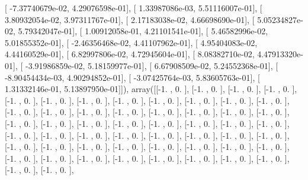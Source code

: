 \documentclass{article}
\begin{document}
       [ -7.37740679e-02,   4.29076598e-01],
       [  1.33987086e-03,   5.51116007e-01],
       [  3.80932054e-02,   3.97311767e-01],
       [  2.17183038e-02,   4.66698690e-01],
       [  5.05234827e-02,   5.79342047e-01],
       [  1.00912058e-01,   4.21101541e-01],
       [  5.46582996e-02,   5.01855352e-01],
       [ -2.46356468e-02,   4.41107962e-01],
       [  4.95404083e-02,   4.44160529e-01],
       [  6.82997806e-02,   4.72945604e-01],
       [  8.08382710e-02,   4.47913320e-01],
       [ -3.91986859e-02,   5.18159977e-01],
       [  6.67908509e-02,   5.24552368e-01],
       [ -8.90454434e-03,   4.90294852e-01],
       [ -3.07425764e-03,   5.83605763e-01],
       [  1.31332146e-01,   5.13897950e-01]]), array([[-1.        ,  0.        ],
       [-1.        ,  0.        ],
       [-1.        ,  0.        ],
       [-1.        ,  0.        ],
       [-1.        ,  0.        ],
       [-1.        ,  0.        ],
       [-1.        ,  0.        ],
       [-1.        ,  0.        ],
       [-1.        ,  0.        ],
       [-1.        ,  0.        ],
       [-1.        ,  0.        ],
       [-1.        ,  0.        ],
       [-1.        ,  0.        ],
       [-1.        ,  0.        ],
       [-1.        ,  0.        ],
       [-1.        ,  0.        ],
       [-1.        ,  0.        ],
       [-1.        ,  0.        ],
       [-1.        ,  0.        ],
       [-1.        ,  0.        ],
       [-1.        ,  0.        ],
       [-1.        ,  0.        ],
       [-1.        ,  0.        ],
       [-1.        ,  0.        ],
       [-1.        ,  0.        ],
       [-1.        ,  0.        ],
       [-1.        ,  0.        ],
       [-1.        ,  0.        ],
       [-1.        ,  0.        ],
       [-1.        ,  0.        ],
       [-1.        ,  0.        ],
       [-1.        ,  0.        ],
       [-1.        ,  0.        ],
       [-1.        ,  0.        ],
       [-1.        ,  0.        ],
       [-1.        ,  0.        ],
       [-1.        ,  0.        ],
       [-1.        ,  0.        ],
       [-1.        ,  0.        ],
       [-1.        ,  0.        ],
       [-1.        ,  0.        ],
       [-1.        ,  0.        ],
       [-1.        ,  0.        ],
       [-1.        ,  0.        ],
       [-1.        ,  0.        ],
       [-1.        ,  0.        ],
       [-1.        ,  0.        ],
       [-1.        ,  0.        ],
       [-1.        ,  0.        ],
       [-1.        ,  0.        ],
       [-1.        ,  0.        ],
       [-1.        ,  0.        ],
       [-1.        ,  0.        ],
       [-1.        ,  0.        ],
\end{document}

